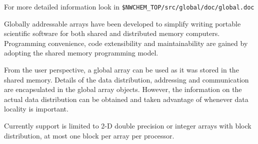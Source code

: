 \sloppy
For more detailed information look in 
{\tt \$NWCHEM\_TOP/src/global/doc/global.doc}     %

\fussy

Globally addressable arrays have been developed to simplify writing
portable scientific software for both shared and distributed memory
computers.  Programming convenience, code extensibility and
maintainability are gained by adopting the shared memory programming
model.

From the user perspective, a global array can be used as it was stored
in the shared memory. Details of the data distribution, addressing and
communication are encapsulated in the global array objects. However,
the information on the actual data distribution can be obtained and
taken advantage of whenever data locality is important.

Currently support is limited to 2-D double precision or integer arrays
with block distribution, at most one block per array per processor.

